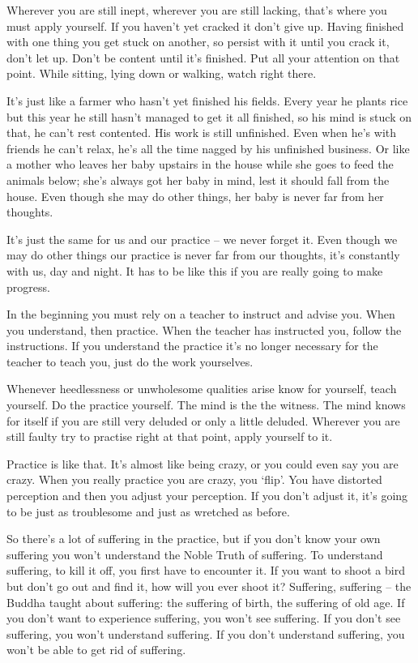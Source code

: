 Wherever you are still inept, wherever you are still lacking, that's where you must apply yourself. If you haven't yet cracked it don't give up. Having finished with one thing you get stuck on another, so persist with it until you crack it, don't let up. Don't be content until it's finished. Put all your attention on that point. While sitting, lying down or walking, watch right there.

It's just like a farmer who hasn't yet finished his fields. Every year he plants rice but this year he still hasn't managed to get it all finished, so his mind is stuck on that, he can't rest contented. His work is still unfinished. Even when he's with friends he can't relax, he's all the time nagged by his unfinished business. Or like a mother who leaves her baby upstairs in the house while she goes to feed the animals below; she's always got her baby in mind, lest it should fall from the house. Even though she may do other things, her baby is never far from her thoughts.

It's just the same for us and our practice -- we never forget it. Even though we may do other things our practice is never far from our thoughts, it's constantly with us, day and night. It has to be like this if you are really going to make progress.

In the beginning you must rely on a teacher to instruct and advise you. When you understand, then practice. When the teacher has instructed you, follow the instructions. If you understand the practice it's no longer necessary for the teacher to teach you, just do the work yourselves.

Whenever heedlessness or unwholesome qualities arise know for yourself, teach yourself. Do the practice yourself. The mind is the  the witness. The mind knows for itself if you are still very deluded or only a little deluded. Wherever you are still faulty try to practise right at that point, apply yourself to it.

Practice is like that. It's almost like being crazy, or you could even say you are crazy. When you really practice you are crazy, you `flip'. You have distorted perception and then you adjust your perception. If you don't adjust it, it's going to be just as troublesome and just as wretched as before.

So there's a lot of suffering in the practice, but if you don't know your own suffering you won't understand the Noble Truth of suffering. To understand suffering, to kill it off, you first have to encounter it. If you want to shoot a bird but don't go out and find it, how will you ever shoot it? Suffering, suffering -- the Buddha taught about suffering: the suffering of birth, the suffering of old age. If you don't want to experience suffering, you won't see suffering. If you don't see suffering, you won't understand suffering. If you don't understand suffering, you won't be able to get rid of suffering.

